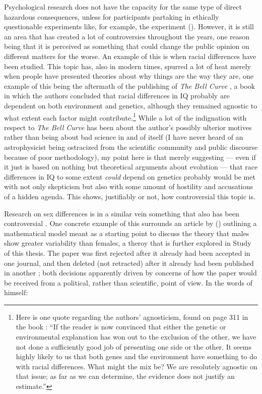 Psychological research does not have the capacity for the same type of direct hazardous consequences, unless for participants partaking in ethically questionable experiments like, for example, the \citeauthor{Milgram1963} experiment (\citeyear{Milgram1963}). However, it is still an area that has created a lot of controversies throughout the years, one reason being that it is perceived as something that could change the public opinion on different matters for the worse. An example of this is when racial differences have been studied. This topic has, also in modern times, spurred a lot of heat merely when people have presented theories about why things are the way they are, one example of this being the aftermath \parencite{Harris2017} of the publishing of \emph{The Bell Curve} \parencite{Herrnstein1996}, a book in which the authors concluded that racial differences in IQ probably are dependent on both environment and genetics, although they remained agnostic to what extent each factor might contribute.\footnote{Here is one quote regarding the authors' agnosticism, found on page 311 in the book \parencite{Herrnstein1996}: ``If the reader is now convinced that either the genetic or environmental explanation has won out to the exclusion of the other, we have not done a sufficiently good job of presenting one side or the other. It seems highly likely to us that both genes and the environment have something to do with racial differences. What might the mix be? We are resolutely agnostic on that issue; as far as we can determine, the evidence does not justify an estimate.''} While a lot of the indignation with respect to \emph{The Bell Curve} has been about the author's possibly ulterior motives rather than being about bad science in and of itself (I have never heard of an astrophysicist being ostracized from the scientific community and public discourse because of poor methodology), my point here is that merely suggesting --- even if it just is based on nothing but theoretical arguments about evolution --- that race differences in IQ to some extent \emph{could} depend on genetics probably would be met with not only skepticism but also with some amount of hostility and accusations of a hidden agenda. This shows, justifiably or not, how controversial this topic is.

Research on sex differences is in a similar vein something that also has been controversial \parencite{Eagly1995}. One concrete example of this surrounds an article by \citeauthor{Hill2017} (\citeyear{Hill2017}) outlining a mathematical model meant as a starting point to discuss the theory that males show greater variability than females, a theroy that is further explored in Study  of this thesis. The paper was first rejected after it already had been accepted in one journal, and then deleted (not retracted) after it already had been published in another \parencite{Azvolinsky2018, Hill2018}; both decisions apparently driven by concerns of how the paper would be received from a political, rather than scientific, point of view. In the words of \textcite{Hill2018} himself:


